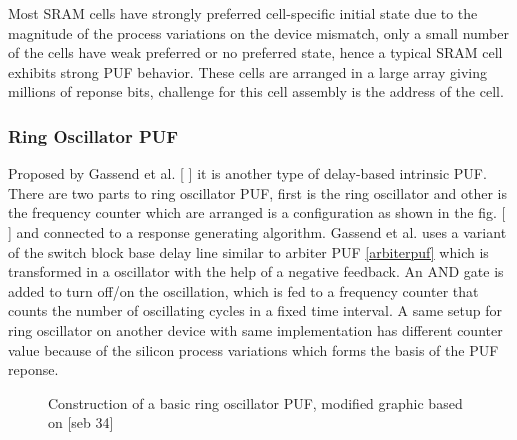 Most SRAM cells have strongly preferred cell-specific initial state due to the magnitude of the process variations on the device mismatch, only a small number of the cells have weak preferred or no preferred state, hence a typical SRAM cell exhibits strong PUF behavior. These cells are arranged in a large array giving millions of reponse bits, challenge for this cell assembly is the address of the cell.\\

\subsubsection{Ring Oscillator PUF}

Proposed by Gassend et al. [ ] it is another type of delay-based intrinsic PUF. There are two parts to ring oscillator PUF, first is the ring oscillator and other is the frequency counter which are arranged is a configuration as shown in the fig. [ ] and connected to a response generating algorithm. Gassend et al. uses a variant of the switch block base delay line similar to arbiter PUF \ref{arbiterpuf} which is transformed in a oscillator with the help of a negative feedback.
An AND gate is added to turn off/on the oscillation, which is fed to a frequency counter that counts the number of oscillating cycles in a fixed time interval. A same setup for ring oscillator on another device with same implementation has different counter value because of the silicon process variations which forms the basis of the PUF reponse.\\

\begin{figure}
\centering
{}
\caption{Construction of a basic ring oscillator PUF, modified graphic based on [seb 34]} 
\label{img:2}
\end{figure}

